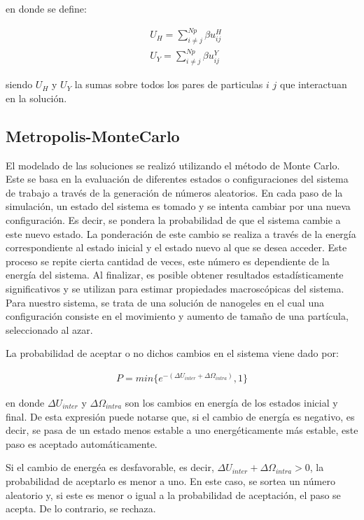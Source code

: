 	\noindent en donde se define:
	
	\begin{align}
		& U_H = \sum^{Np}_{i \neq j} \beta u^H_{ij} \\
		& U_Y = \sum^{Np}_{i \neq j} \beta u^Y_{ij}
	\end{align}
	
	\noindent siendo $U_H$ y $U_Y$ la sumas sobre todos los pares de particulas $i$ $j$ que interactuan en la soluci\'on.
	
	
	
	\subsection{Metropolis-MonteCarlo}
	
	El modelado de las soluciones se realiz\'o utilizando el m\'etodo de Monte Carlo. Este se basa en la evaluaci\'on de diferentes estados o configuraciones del sistema de trabajo a trav\'es de la generaci\'on de n\'umeros aleatorios.
	En cada paso de la simulaci\'on, un estado del sistema es tomado y se intenta cambiar por una nueva configuraci\'on. Es decir, se pondera la probabilidad de que el sistema cambie a este nuevo estado. La ponderaci\'on de este cambio se realiza a trav\'es de la energ\'ia correspondiente al estado inicial y el estado nuevo al que se desea acceder.
	Este proceso se repite cierta cantidad de veces, este n\'umero es dependiente de la energ\'ia del sistema. Al finalizar, es posible obtener resultados estad\'isticamente significativos y se utilizan para estimar propiedades macrosc\'opicas del sistema.
	Para nuestro sistema, se trata de una soluci\'on de nanogeles en el cual una configuraci\'on consiste en el movimiento y aumento de tama\~no de una part\'icula, seleccionado al azar.
	
	La probabilidad de aceptar o no dichos cambios en el sistema viene dado por:
	
	\begin{align}
		P = min \{e^{-(\Delta U_{inter} + \Delta \Omega_{intra})},1\}
	\end{align}
	
	\noindent en donde $\Delta U_{inter}$ y $\Delta\Omega_{intra}$ son los cambios en energ\'ia de los estados inicial y final. De esta expresi\'on puede notarse que, si el cambio de energ\'ia es negativo, es decir, se pasa de un estado menos estable a uno energ\'eticamente m\'as estable, este paso es aceptado autom\'aticamente.
	
	Si el cambio de energ\'ea es desfavorable, es decir, $\Delta U_{inter} + \Delta \Omega_{intra} > 0$, la probabilidad de aceptarlo es menor a uno. En este caso, se sortea un n\'umero aleatorio y, si este es menor o igual a la probabilidad de aceptaci\'on, el paso se acepta. De lo contrario, se rechaza. 
	
